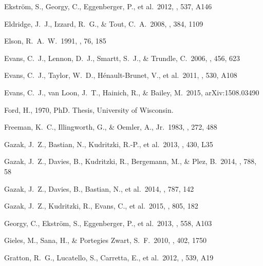 \documentclass[useAMS,usenatbib]{mn2e}
\begin{document}
\begin{thebibliography}{99}
 Ekstr{\"o}m, S., Georgy, C., Eggenberger, P., et al.\ 2012, \aap, 537, A146

 Eldridge, J.~J.,
Izzard, R.~G., \& Tout, C.~A.\ 2008, \mnras, 384, 1109

 Elson, R.~A.~W.\ 1991, \apjs,
76, 185

 Evans, C.~J., Lennon, D.~J., Smartt, S.~J., \& Trundle, C.\ 2006, \aap, 456, 623

 Evans, C.~J., Taylor, W.~D., H{\'e}nault-Brunet, V., et al.\ 2011, \aap, 530, A108

 Evans, C.~J., van Loon,
J.~T., Hainich, R., \& Bailey, M.\ 2015, arXiv:1508.03490

 Ford, H., 1970, PhD. Thesis, University of Wisconsin.

 Freeman, K.~C.,
Illingworth, G., \& Oemler, A., Jr.\ 1983, \apj, 272, 488

 Gazak, J.~Z., Bastian,
N., Kudritzki, R.-P., et al.\ 2013, \mnras, 430, L35

 Gazak, J.~Z., Davies, B.,
Kudritzki, R., Bergemann, M., \& Plez, B.\ 2014, \apj, 788, 58

 Gazak, J.~Z., Davies, B.,
Bastian, N., et al.\ 2014, \apj, 787, 142

 Gazak, J.~Z., Kudritzki,
R., Evans, C., et al.\ 2015, \apj, 805, 182

 Georgy, C., Ekstr{\"o}m, S., Eggenberger, P., et al.\ 2013, \aap, 558, A103

 Gieles, M., Sana, H.,
\& Portegies Zwart, S.~F.\ 2010, \mnras, 402, 1750


 Gratton, R.~G., Lucatello, S., Carretta, E., et al.\ 2012, \aap, 539, A19


\end{thebibliography}
\end{document}
